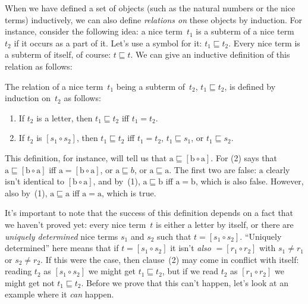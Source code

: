 \documentclass[../../../include/open-logic-section]{subfiles}
\begin{document}


When we have defined a set of objects (such as the natural numbers or
the nice terms) inductively, we can also define \emph{relations on}
these objects by induction.  For instance, consider the following
idea: a nice term~$t_1$ is a subterm of a nice term~$t_2$ if it occurs as
a part of it.  Let's use a symbol for it: $t_1 \sqsubseteq t_2$. Every
nice term is a subterm of itself, of course: $t \sqsubseteq t$. We can
give an inductive definition of this relation as follows:

\begin{defn}
  The relation of a nice term~$t_1$ being a subterm of~$t_2$, $t_1
  \sqsubseteq t_2$, is defined by induction on~$t_2$ as follows:
  \begin{enumerate}
  \item If $t_2$ is a letter, then $t_1 \sqsubseteq t_2$ iff $t_1 = t_2$.
  \item If $t_2$ is $[s_1 \circ s_2]$, then $t_1 \sqsubseteq t_2$ iff $t_1 =
    t_2$, $t_1 \sqsubseteq s_1$, or $t_1 \sqsubseteq s_2$.
  \end{enumerate}
\end{defn}

This definition, for instance, will tell us that $\mathrm{a}
\sqsubseteq [\mathrm{b} \circ \mathrm{a}]$. For (2) says that
$\mathrm{a} \sqsubseteq [\mathrm{b} \circ \mathrm{a}]$ iff $\mathrm{a}
= [\mathrm{b} \circ \mathrm{a}]$, or $\mathrm{a} \sqsubseteq b$, or
$\mathrm{a} \sqsubseteq \mathrm{a}$. The first two are false:
$\mathrm{a}$ clearly isn't identical to $[\mathrm{b} \circ
  \mathrm{a}]$, and by~(1), $\mathrm{a} \sqsubseteq \mathrm{b}$ iff
$\mathrm{a} = \mathrm{b}$, which is also false. However, also by~(1),
$\mathrm{a} \sqsubseteq \mathrm{a}$ iff $\mathrm{a} = \mathrm{a}$,
which is true.

It's important to note that the success of this definition depends on
a fact that we haven't proved yet: every nice term~$t$ is either a
letter by itself, or there are \emph{uniquely determined} nice terms
$s_1$ and $s_2$ such that $t = [s_1 \circ s_2]$.  ``Uniquely
determined'' here means that if $t = [s_1 \circ s_2]$ it isn't
\emph{also} $= [r_1 \circ r_2]$ with $s_1 \neq r_1$ or $s_2 \neq r_2$.
If this were the case, then clause~(2) may come in conflict with
itself: reading $t_2$ as $[s_1 \circ s_2]$ we might get $t_1
\sqsubseteq t_2$, but if we read $t_2$ as $[r_1 \circ r_2]$ we might
get not $t_1 \sqsubseteq t_2$.  Before we prove that this can't
happen, let's look at an example where it \emph{can} happen.
\end{document}
